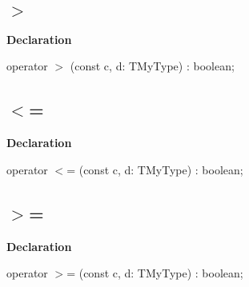 \documentclass{report}
\begin{document}
\subsection*{{$>$}}
\begin{list}{}{
\setlength{\itemindent}{0cm}
\setlength{\listparindent}{0cm}
\setlength{\leftmargin}{\evensidemargin}
\addtolength{\leftmargin}{\tmplength}
\settowidth{\labelsep}{X}
\addtolength{\leftmargin}{\labelsep}
\setlength{\labelwidth}{\tmplength}
}
\begin{flushleft}
\item[\textbf{Declaration}\hfill]
\begin{ttfamily}
operator {$>$} (const c, d: TMyType) : boolean;\end{ttfamily}


\end{flushleft}
\end{list}
\subsection*{{$<$}=}
\begin{list}{}{
\setlength{\itemindent}{0cm}
\setlength{\listparindent}{0cm}
\setlength{\leftmargin}{\evensidemargin}
\addtolength{\leftmargin}{\tmplength}
\settowidth{\labelsep}{X}
\addtolength{\leftmargin}{\labelsep}
\setlength{\labelwidth}{\tmplength}
}
\begin{flushleft}
\item[\textbf{Declaration}\hfill]
\begin{ttfamily}
operator {$<$}= (const c, d: TMyType) : boolean;\end{ttfamily}


\end{flushleft}
\end{list}
\subsection*{{$>$}=}
\begin{list}{}{
\setlength{\itemindent}{0cm}
\setlength{\listparindent}{0cm}
\setlength{\leftmargin}{\evensidemargin}
\addtolength{\leftmargin}{\tmplength}
\settowidth{\labelsep}{X}
\addtolength{\leftmargin}{\labelsep}
\setlength{\labelwidth}{\tmplength}
}
\begin{flushleft}
\item[\textbf{Declaration}\hfill]
\begin{ttfamily}
operator {$>$}= (const c, d: TMyType) : boolean;\end{ttfamily}


\end{flushleft}
\end{list}
\end{document}
